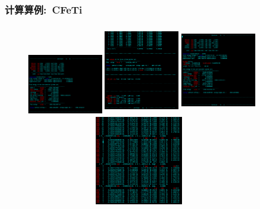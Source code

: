 \begin{frame}
	\frametitle{计算算例:~\textrm{CFeTi}}
\begin{figure}[h!]
\centering
\vskip -0.41in
\includegraphics[height=1.05in,width=1.30in,viewport=0 0 1268 805,clip]{Figures/VASP_huge_SJTU-CdHgTe_OUTCAR-1.png}
\includegraphics[height=1.55in,width=1.30in,viewport=0 0 1268 1490,clip]{Figures/VASP_huge_SJTU-CdHgTe_OUTCAR-2.png}
\includegraphics[height=1.55in,width=1.30in,viewport=0 0 1268 1359,clip]{Figures/VASP_huge_SJTU-CdHgTe_OUTCAR-3.png}
\includegraphics[height=1.55in,width=3.90in,viewport=0 50 1200 650,clip]{Figures/VASP_huge_SJTU-CdHgTe_OSZICAR.png}
\label{VASP_Model-1}
\end{figure} 
\end{frame}

